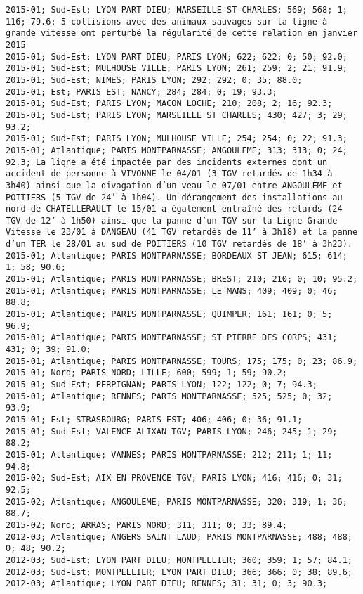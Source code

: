 \documentclass{article}
\begin{document}
\begin{Verbatim}[commandchars=\\\{\}]
2015-01; Sud-Est; LYON PART DIEU; MARSEILLE ST CHARLES; 569; 568; 1; 116; 79.6; 5 collisions avec des animaux sauvages sur la ligne à grande vitesse ont perturbé la régularité de cette relation en janvier 2015
2015-01; Sud-Est; LYON PART DIEU; PARIS LYON; 622; 622; 0; 50; 92.0; 
2015-01; Sud-Est; MULHOUSE VILLE; PARIS LYON; 261; 259; 2; 21; 91.9; 
2015-01; Sud-Est; NIMES; PARIS LYON; 292; 292; 0; 35; 88.0; 
2015-01; Est; PARIS EST; NANCY; 284; 284; 0; 19; 93.3; 
2015-01; Sud-Est; PARIS LYON; MACON LOCHE; 210; 208; 2; 16; 92.3; 
2015-01; Sud-Est; PARIS LYON; MARSEILLE ST CHARLES; 430; 427; 3; 29; 93.2; 
2015-01; Sud-Est; PARIS LYON; MULHOUSE VILLE; 254; 254; 0; 22; 91.3; 
2015-01; Atlantique; PARIS MONTPARNASSE; ANGOULEME; 313; 313; 0; 24; 92.3; La ligne a été impactée par des incidents externes dont un accident de personne à VIVONNE le 04/01 (3 TGV retardés de 1h34 à 3h40) ainsi que la divagation d’un veau le 07/01 entre ANGOULÊME et POITIERS (5 TGV de 24’ à 1h04). Un dérangement des installations au nord de CHATELLERAULT le 15/01 a également entraîné des retards (24 TGV de 12’ à 1h50) ainsi que la panne d’un TGV sur la Ligne Grande Vitesse le 23/01 à DANGEAU (41 TGV retardés de 11’ à 3h18) et la panne d’un TER le 28/01 au sud de POITIERS (10 TGV retardés de 18’ à 3h23).
2015-01; Atlantique; PARIS MONTPARNASSE; BORDEAUX ST JEAN; 615; 614; 1; 58; 90.6; 
2015-01; Atlantique; PARIS MONTPARNASSE; BREST; 210; 210; 0; 10; 95.2; 
2015-01; Atlantique; PARIS MONTPARNASSE; LE MANS; 409; 409; 0; 46; 88.8; 
2015-01; Atlantique; PARIS MONTPARNASSE; QUIMPER; 161; 161; 0; 5; 96.9; 
2015-01; Atlantique; PARIS MONTPARNASSE; ST PIERRE DES CORPS; 431; 431; 0; 39; 91.0; 
2015-01; Atlantique; PARIS MONTPARNASSE; TOURS; 175; 175; 0; 23; 86.9; 
2015-01; Nord; PARIS NORD; LILLE; 600; 599; 1; 59; 90.2; 
2015-01; Sud-Est; PERPIGNAN; PARIS LYON; 122; 122; 0; 7; 94.3; 
2015-01; Atlantique; RENNES; PARIS MONTPARNASSE; 525; 525; 0; 32; 93.9; 
2015-01; Est; STRASBOURG; PARIS EST; 406; 406; 0; 36; 91.1; 
2015-01; Sud-Est; VALENCE ALIXAN TGV; PARIS LYON; 246; 245; 1; 29; 88.2; 
2015-01; Atlantique; VANNES; PARIS MONTPARNASSE; 212; 211; 1; 11; 94.8; 
2015-02; Sud-Est; AIX EN PROVENCE TGV; PARIS LYON; 416; 416; 0; 31; 92.5; 
2015-02; Atlantique; ANGOULEME; PARIS MONTPARNASSE; 320; 319; 1; 36; 88.7; 
2015-02; Nord; ARRAS; PARIS NORD; 311; 311; 0; 33; 89.4; 
2012-03; Atlantique; ANGERS SAINT LAUD; PARIS MONTPARNASSE; 488; 488; 0; 48; 90.2; 
2012-03; Sud-Est; LYON PART DIEU; MONTPELLIER; 360; 359; 1; 57; 84.1; 
2012-03; Sud-Est; MONTPELLIER; LYON PART DIEU; 366; 366; 0; 38; 89.6; 
2012-03; Atlantique; LYON PART DIEU; RENNES; 31; 31; 0; 3; 90.3; 

\end{Verbatim}
\end{document}
